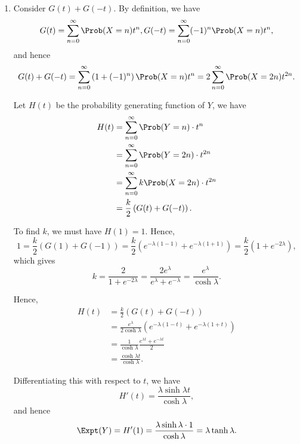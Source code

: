 \begin{enumerate}
    \item Consider \(G(t) + G(-t)\). By definition, we have
          \[
              G(t) = \sum_{n = 0}^{\infty} \Prob(X = n) t^n, G(-t) = \sum_{n = 0}^{\infty} (-1)^n \Prob(X = n) t^n,
          \]
          and hence
          \[
              G(t) + G(-t) = \sum_{n = 0}^{\infty} \left(1 + (-1)^n\right) \Prob(X = n) t^n = 2 \sum_{n = 0}^{\infty} \Prob(X = 2n) t^{2n}.
          \]

          Let \(H(t)\) be the probability generating function of \(Y\), we have
          \begin{align*}
              H(t) & = \sum_{n = 0}^{\infty} \Prob(Y = n) \cdot t^n       \\
                   & = \sum_{n = 0}^{\infty} \Prob(Y = 2n) \cdot t^{2n}   \\
                   & = \sum_{n = 0}^{\infty} k \Prob(X = 2n) \cdot t^{2n} \\
                   & = \frac{k}{2} \left(G(t) + G(-t)\right).
          \end{align*}

          To find \(k\), we must have \(H(1) = 1\). Hence,
          \[
              1 = \frac{k}{2} \left(G(1) + G(-1)\right) = \frac{k}{2} \left(e^{- \lambda (1 - 1)} + e^{- \lambda (1 + 1)}\right) = \frac{k}{2} \left(1 + e^{-2 \lambda}\right),
          \]
          which gives
          \[
              k = \frac{2}{1 + e^{-2\lambda}} = \frac{2 e^{\lambda}}{e^{\lambda} + e^{-\lambda}} = \frac{e^{\lambda}}{\cosh \lambda}.
          \]

          Hence,
          \begin{align*}
              H(t) & = \frac{k}{2} \left(G(t) + G(-t)\right)                                                       \\
                   & = \frac{e^{\lambda}}{2 \cosh \lambda} \left(e^{-\lambda(1 - t)}  + e^{-\lambda(1 + t)}\right) \\
                   & = \frac{1}{\cosh \lambda} \frac{e^{\lambda t} + e^{-\lambda t}}{2}                            \\
                   & = \frac{\cosh \lambda t}{\cosh \lambda}.
          \end{align*}

          Differentiating this with respect to \(t\), we have
          \[
              H'(t) = \frac{\lambda \sinh \lambda t}{\cosh \lambda},
          \]
          and hence
          \[
              \Expt(Y) = H'(1) = \frac{\lambda \sinh \lambda \cdot 1}{\cosh \lambda} = \lambda \tanh \lambda.
          \]


\end{enumerate}
